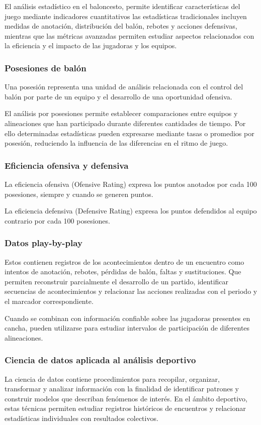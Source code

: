 El análisis estadístico en el baloncesto, permite identificar características del juego mediante indicadores cuantitativos las estadísticas tradicionales incluyen medidas de anotación, distribución del balón, rebotes y acciones defensivas, mientras que las métricas avanzadas permiten estudiar aspectos relacionados con la eficiencia y el impacto de las jugadoras y los equipos.\cite{zuccolotto2020basketball}

\subsubsection{Posesiones de balón}
Una posesión representa una unidad de análisis relacionada con el control del balón por parte de un equipo y el desarrollo de una oportunidad ofensiva.

El análisis por posesiones permite establecer comparaciones entre equipos y alineaciones que han participado durante diferentes cantidades de tiempo.
Por ello determinadas estadísticas pueden expresarse mediante tasas o promedios por posesión, reduciendo la influencia de las diferencias en el ritmo de juego.
\cite{zuccolotto2020basketball}
\subsubsection{Eficiencia ofensiva y defensiva}
La eficiencia ofensiva (Ofensive Rating) expresa los puntos anotados por cada 100 posesiones, siempre y cuando se generen puntos.

La eficiencia defensiva (Defensive Rating) expresa los puntos defendidos al equipo contrario por cada 100 posesiones. 

\subsubsection{Datos play-by-play}
Estos contienen registros de los acontecimientos dentro de un encuentro como intentos de anotación, rebotes, pérdidas de balón, faltas y sustituciones. Que permiten reconstruir parcialmente el desarrollo de un partido, identificar secuencias de acontecimientos y relacionar las acciones realizadas con el periodo y el marcador correspondiente.

Cuando se combinan con información confiable sobre las jugadoras presentes en cancha, pueden utilizarse para estudiar intervalos de participación de diferentes alineaciones.
\cite{rubies2021basketball,zuccolotto2020basketball}

\subsubsection{Ciencia de datos aplicada al análisis deportivo}
La ciencia de datos contiene procedimientos para recopilar, organizar, transformar y analizar información con la finalidad de identificar patrones y construir modelos que describan fenómenos de interés. En el ámbito deportivo, estas técnicas permiten estudiar registros históricos de encuentros y relacionar estadísticas individuales con resultados colectivos.
\cite{zuccolotto2020basketball}
